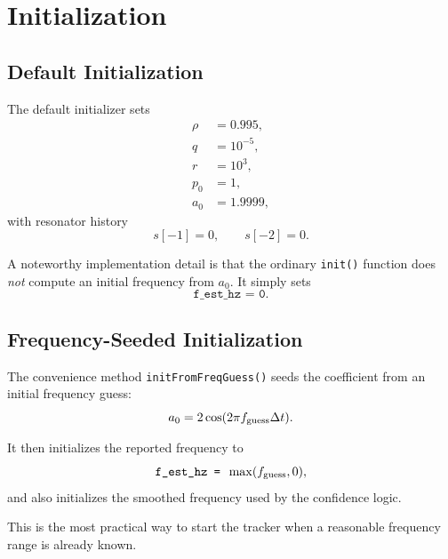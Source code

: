 \documentclass[conference]{IEEEtran}
\begin{document}
    \section{Initialization}\label{sec:init}

    \subsection{Default Initialization}

    The default initializer sets
    \begin{align}
        \rho &= 0.995,\\
        q &= 10^{-5},\\
        r &= 10^3,\\
        p_0 &= 1,\\
        a_0 &= 1.9999,
    \end{align}
    with resonator history
    \begin{equation}
        s[-1]=0,\qquad s[-2]=0.
    \end{equation}

    A noteworthy implementation detail is that the ordinary \texttt{init()}
    function does \emph{not} compute an initial frequency from $a_0$. It simply
    sets
    \begin{equation}
        \texttt{f\_est\_hz = 0}.
    \end{equation}

    \subsection{Frequency-Seeded Initialization}

    The convenience method \texttt{initFromFreqGuess()} seeds the coefficient from
    an initial frequency guess:
    \begin{equation}
        a_0 = 2\cos(2\pi f_{\rm guess}\Delta t).
    \end{equation}

    It then initializes the reported frequency to
    \begin{equation}
        \texttt{f\_est\_hz = } \max(f_{\rm guess},0),
    \end{equation}
    and also initializes the smoothed frequency used by the confidence logic.

    This is the most practical way to start the tracker when a reasonable
    frequency range is already known.
\end{document}
